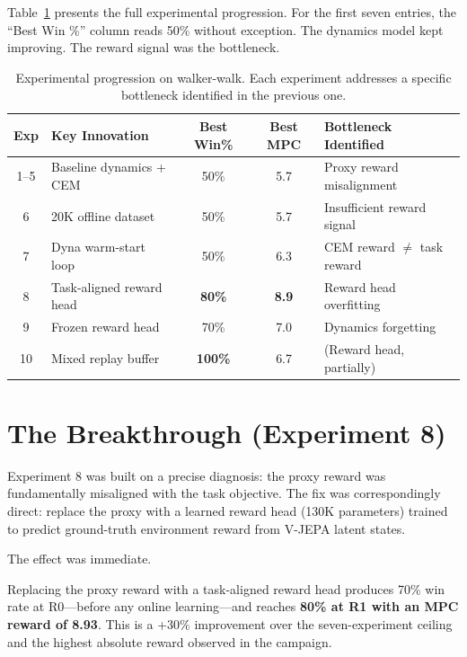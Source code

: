 \documentclass{article}
\begin{document}
Table~\ref{tab:progression} presents the full experimental progression. For the first seven entries, the ``Best Win \%'' column reads 50\% without exception. The dynamics model kept improving. The reward signal was the bottleneck.

\begin{table}[H]
\centering
\caption{Experimental progression on walker-walk. Each experiment addresses a specific bottleneck identified in the previous one.}
\label{tab:progression}
\begin{tabular}{clccl}
\toprule
\textbf{Exp} & \textbf{Key Innovation} & \textbf{Best Win\%} & \textbf{Best MPC} & \textbf{Bottleneck Identified} \\
\midrule
1--5 & Baseline dynamics + CEM & 50\% & 5.7 & Proxy reward misalignment \\
6 & 20K offline dataset & 50\% & 5.7 & Insufficient reward signal \\
7 & Dyna warm-start loop & 50\% & 6.3 & CEM reward $\neq$ task reward \\
\rowcolor{green!8} 8 & Task-aligned reward head & \textbf{80\%} & \textbf{8.9} & Reward head overfitting \\
9 & Frozen reward head & 70\% & 7.0 & Dynamics forgetting \\
\rowcolor{green!8} 10 & Mixed replay buffer & \textbf{100\%} & 6.7 & (Reward head, partially) \\
\bottomrule
\end{tabular}
\end{table}

\section{The Breakthrough (Experiment 8)}

Experiment 8 was built on a precise diagnosis: the proxy reward was fundamentally misaligned with the task objective. The fix was correspondingly direct: replace the proxy with a learned reward head (130K parameters) trained to predict ground-truth environment reward from V-JEPA latent states.

The effect was immediate.

\begin{breakthroughbox}
\small Replacing the proxy reward with a task-aligned reward head produces 70\% win rate at R0---before any online learning---and reaches \textbf{80\% at R1 with an MPC reward of 8.93}. This is a +30\% improvement over the seven-experiment ceiling and the highest absolute reward observed in the campaign.
\end{breakthroughbox}
\end{document}
